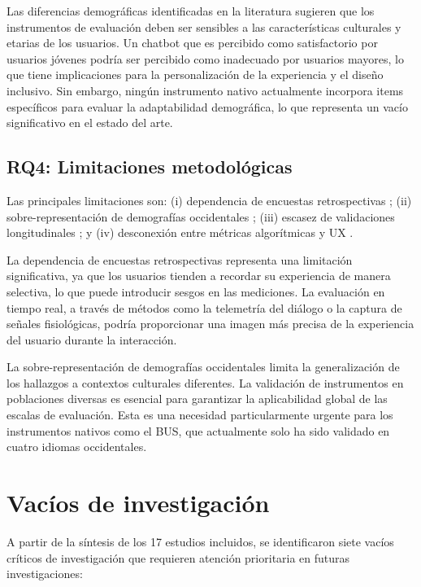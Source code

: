 \documentclass[11pt,twocolumn]{article}
\begin{document}
Las diferencias demográficas identificadas en la literatura sugieren que los instrumentos de evaluación deben ser sensibles a las características culturales y etarias de los usuarios. Un chatbot que es percibido como satisfactorio por usuarios jóvenes podría ser percibido como inadecuado por usuarios mayores, lo que tiene implicaciones para la personalización de la experiencia y el diseño inclusivo. Sin embargo, ningún instrumento nativo actualmente incorpora items específicos para evaluar la adaptabilidad demográfica, lo que representa un vacío significativo en el estado del arte.

\subsection{RQ4: Limitaciones metodológicas}

Las principales limitaciones son: (i) dependencia de encuestas retrospectivas \cite{marconi2026}; (ii) sobre-representación de demografías occidentales \cite{folstad2021}; (iii) escasez de validaciones longitudinales \cite{kuhail2022}; y (iv) desconexión entre métricas algorítmicas y UX \cite{jannach2022}.

La dependencia de encuestas retrospectivas representa una limitación significativa, ya que los usuarios tienden a recordar su experiencia de manera selectiva, lo que puede introducir sesgos en las mediciones. La evaluación en tiempo real, a través de métodos como la telemetría del diálogo o la captura de señales fisiológicas, podría proporcionar una imagen más precisa de la experiencia del usuario durante la interacción.

La sobre-representación de demografías occidentales limita la generalización de los hallazgos a contextos culturales diferentes. La validación de instrumentos en poblaciones diversas es esencial para garantizar la aplicabilidad global de las escalas de evaluación. Esta es una necesidad particularmente urgente para los instrumentos nativos como el BUS, que actualmente solo ha sido validado en cuatro idiomas occidentales.

\section{Vacíos de investigación}

A partir de la síntesis de los 17 estudios incluidos, se identificaron siete vacíos críticos de investigación que requieren atención prioritaria en futuras investigaciones:
\end{document}
